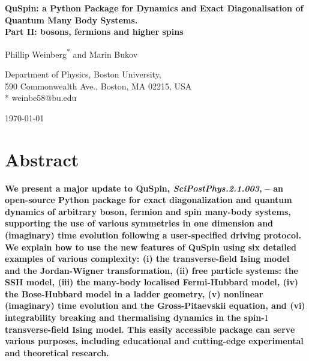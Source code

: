 \documentclass{SciPost}
\newcommand\0{\scalebox{-1}[1]{0}}
\begin{document}
\begin{center}{\Large \textbf{
QuSpin: a Python Package for Dynamics and Exact Diagonalisation of Quantum Many Body Systems.\\
\large Part II: bosons, fermions and higher spins
}}\end{center}

\begin{center}
Phillip Weinberg\textsuperscript{*} and Marin Bukov
\end{center}

\begin{center}
Department of Physics, Boston University, \\
590 Commonwealth Ave., Boston, MA 02215, USA
\\
* weinbe58@bu.edu
\end{center}

\begin{center}
\today
\end{center}


\section*{Abstract}
{\bf 
We present a major update to QuSpin, \emph{SciPostPhys.2.1.003}, -- an open-source Python package for exact diagonalization and quantum dynamics of arbitrary boson, fermion and spin many-body systems, supporting the use of various symmetries in one dimension and (imaginary) time evolution following a user-specified driving protocol. We explain how to use the new features of QuSpin using six detailed examples of various complexity: (i) the transverse-field Ising model and the Jordan-Wigner transformation, (ii) free particle systems: the SSH model, (iii) the many-body localised Fermi-Hubbard model, (iv) the Bose-Hubbard model in a ladder geometry, (v) nonlinear (imaginary) time evolution and the Gross-Pitaevskii equation, and (vi) integrability breaking and thermalising dynamics in the spin-$1$ transverse-field Ising model. This easily accessible package can serve various purposes, including educational and cutting-edge experimental and theoretical research.
}
\end{document}
